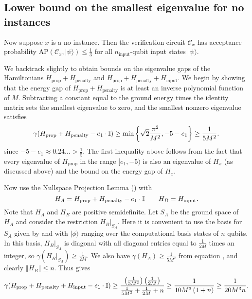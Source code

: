 \documentclass[../thesis-main/thesis-main]{subfiles}
\begin{document}
\subsection{Lower bound on the smallest eigenvalue for no instances}
\label{sec:mappingno}

Now suppose $x$ is a no instance. Then the verification circuit $\mathcal{C}_{x}$ has acceptance probability $\text{AP}\left(\mathcal{C}_{x},|\psi\rangle\right)\leq\frac{1}{3}$ for all $n_{\text{input}}$-qubit input states $|\psi\rangle$.

We backtrack slightly to obtain bounds on the eigenvalue gaps of the Hamiltonians $H_{\text{prop}}+H_{\text{penalty}}$ and $H_{\text{prop}}+H_{\text{penalty}}+H_{\text{input}}$. We begin by showing that the energy gap of $H_{\text{prop}}+H_{\text{penalty}}$ is at least an inverse polynomial function of $M$. Subtracting a constant equal to the ground energy times the identity matrix sets the smallest eigenvalue to zero, and the smallest nonzero eigenvalue satisfies 
\begin{equation}
\gamma(H_{\text{prop}}+H_{\text{penalty}}-e_{1}\cdot\mathbb{I})\geq\min\left\{ \sqrt{2}\frac{\pi^{2}}{M^{2}},-5-e_{1}\right\} \geq\frac{1}{5M^{2}}.\label{eq:gamma_Ha}
\end{equation}
since $-5-e_{1}\approx0.24\ldots>\frac{1}{5}$. The first inequality above follows from the fact that every eigenvalue of $H_{\text{prop}}$ in the range $[e_{1},-5)$ is also an eigenvalue of $H_{x}$ (as discussed above) and the bound  on the energy gap of $H_{x}$.

Now use the Nullspace Projection Lemma () with 
\[
H_{A}=H_{\text{prop}}+H_{\text{penalty}}-e_{1}\cdot\mathbb{I}\qquad H_{B}=H_{\text{input}}.
\]
Note that $H_{A}$ and $H_{B}$ are positive semidefinite. Let $S_{A}$ be the ground space of $H_{A}$ and consider the restriction $H_{B}|_{S_{A}}$. Here it is convenient to use the basis for $S_{A}$ given by  and  with $|\phi\rangle$ ranging over the computational basis states of $n$ qubits. In this basis, $H_{B}|_{S_{A}}$ is diagonal with all diagonal entries equal to $\frac{1}{2M}$ times an integer, so $\gamma(H_{B}|_{S_{A}})\geq\frac{1}{2M}$. We also have $\gamma(H_{A})\geq\frac{1}{5M^{2}}$ from equation , and clearly $\left\Vert H_{B}\right\Vert \leq n$. Thus  gives
\begin{equation}
\gamma(H_{\text{prop}}+H_{\text{penalty}}+H_{\text{input}}-e_{1}\cdot\mathbb{I})\geq\frac{\left(\frac{1}{5M^{2}}\right)\left(\frac{1}{2M}\right)}{\frac{1}{5M^{2}}+\frac{1}{2M}+n}\geq\frac{1}{10M^{3}\left(1+n\right)}\geq\frac{1}{20M^{3}n}.\label{eq:lowerbound_uptoinput}
\end{equation}
\end{document}
